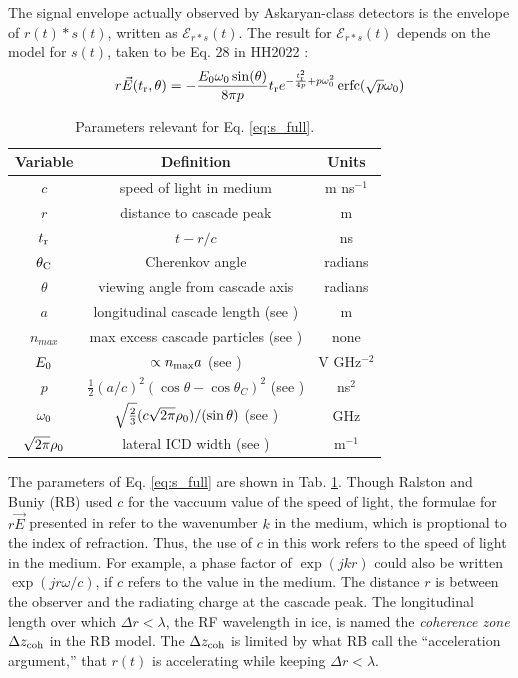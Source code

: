 \documentclass[amsmath,amssymb,aps,prd,10pt,twocolumn,showkeys]{revtex4}
\DeclareMathOperator\erfc{erfc}
\begin{document}
The signal envelope actually observed by Askaryan-class detectors is the envelope of $r(t) * s(t)$, written as $\mathcal{E}_{r*s}(t)$.  The result for $\mathcal{E}_{r*s}(t)$ depends on the model for $s(t)$, taken to be Eq. 28 in HH2022 \cite{PhysRevD.105.123019}:
\begin{equation}
r\vec{E}(t_{\rm r},\theta) = -\frac{E_0\omega_0 \sin(\theta)}{8\pi p}t_{\rm r}e^{-\frac{t_{\rm r}^2}{4p}+p\omega_0^2}\erfc(\sqrt{p}\omega_0) \label{eq:s_full}
\end{equation}
\begin{table}
\begin{tabular}{| c | c | c |} \hline
\textbf{Variable} & \textbf{Definition} & \textbf{Units}\\ \hline
$c$ & speed of light in medium & m ns$^{-1}$ \\ 
$r$ & distance to cascade peak & m \\
$t_{\rm r}$ & $t-r/c$ & ns \\
$\theta_{\rm C}$ & Cherenkov angle & radians \\ 
$\theta$ & viewing angle from cascade axis & radians \\ 
$a$ & longitudinal cascade length (see \cite{10.1103/physrevd.65.016003}) & m \\ 
$n_{max}$ & max excess cascade particles (see \cite{10.1103/physrevd.65.016003})  & none \\
$E_{\rm 0}$ & $\propto n_{\rm max}a$ (see \cite{10.1103/physrevd.65.016003}) & V GHz$^{-2}$ \\
$p$ & $\frac{1}{2}(a/c)^2 \left(\cos\theta - \cos\theta_C\right)^2$ (see \cite{PhysRevD.105.123019}) & ns$^2$ \\ 
$\omega_{\rm 0}$ & $\sqrt{\frac{2}{3}} (c\sqrt{2\pi}\rho_{\rm 0})/(\sin\theta)$ (see \cite{10.1016/j.astropartphys.2017.03.008}) & GHz \\
$\sqrt{2\pi}\rho_{\rm 0}$ & lateral ICD width (see \cite{10.1016/j.astropartphys.2017.03.008}) & m$^{-1}$ \\ \hline
\end{tabular}
\caption{\label{tab:param} Parameters relevant for Eq. \ref{eq:s_full}.}
\end{table}

The parameters of Eq. \ref{eq:s_full} are shown in Tab. \ref{tab:param}.  Though Ralston and Buniy (RB) \cite{10.1103/physrevd.65.016003} used $c$ for the vaccuum value of the speed of light, the formulae for $r \vec{E}$ presented in \cite{10.1103/physrevd.65.016003} refer to the wavenumber $k$ in the medium, which is proptional to the index of refraction. Thus, the use of $c$ in this work refers to the speed of light in the medium.  For example, a phase factor of $\exp(j k r)$ could also be written $\exp(j r \omega/c)$, if $c$ refers to the value in the medium.  The distance $r$ is between the observer and the radiating charge at the cascade peak.  The longitudinal length over which $\Delta r < \lambda$, the RF wavelength in ice, is named the \textit{coherence zone} $\Delta z_{\rm coh}$ in the RB model.  The $\Delta z_{\rm coh}$ is limited by what RB call the ``acceleration argument,'' that $r(t)$ is accelerating while keeping $\Delta r < \lambda$.
\end{document}
